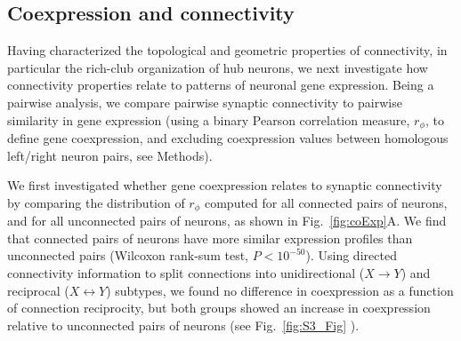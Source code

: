 \documentclass[10pt,letterpaper]{article}
\begin{document}

\subsection*{Coexpression and connectivity}

Having characterized the topological and geometric properties of connectivity, in particular the rich-club organization of hub neurons, we next investigate how connectivity properties relate to patterns of neuronal gene expression.
Being a pairwise analysis, we compare pairwise synaptic connectivity to pairwise similarity in gene expression (using a binary Pearson correlation measure, $r_\phi$, to define gene coexpression, and excluding coexpression values between homologous left/right neuron pairs, see Methods).

We first investigated whether gene coexpression relates to synaptic connectivity by comparing the distribution of $r_\phi$ computed for all connected pairs of neurons, and for all unconnected pairs of neurons, as shown in Fig.~\ref{fig:coExp}A.
We find that connected pairs of neurons have more similar expression profiles than unconnected pairs (Wilcoxon rank-sum test, $P < 10^{-50}$).
Using directed connectivity information to split connections into unidirectional ($X \rightarrow Y$) and reciprocal ($X \leftrightarrow Y$) subtypes, we found no difference in coexpression as a function of connection reciprocity, but both groups showed an increase in coexpression relative to unconnected pairs of neurons (see Fig.~\ref{fig:S3_Fig} ).
\end{document}

